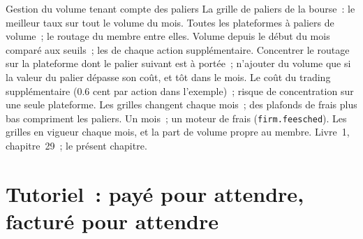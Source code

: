 \begin{strategyfile}{Gestion du volume tenant compte des paliers}\label{strat:hf:rebates-inverted-venues-and-tiers:tier}
 La grille de paliers de la bourse~: le meilleur taux sur tout le volume du mois.
 Toutes les plateformes à paliers de volume~; le routage du membre entre elles.
 Volume depuis le début du mois comparé aux seuils~; les  de chaque action supplémentaire.
 Concentrer le routage sur la plateforme dont le palier suivant est à portée~; n'ajouter du volume que si la valeur du palier dépasse son coût,
et tôt dans le mois.
 Le coût du trading supplémentaire (0.6 cent par action dans l'exemple)~; risque de concentration sur une seule plateforme.
 Les grilles changent chaque mois~; des plafonds de frais plus bas compriment les paliers.
 Un mois~; un moteur de frais (\texttt{firm.feesched}).
 Les grilles en vigueur chaque mois, et la part de volume propre au membre.
 Livre~1, chapitre~29~; le présent chapitre.
\end{strategyfile}

\section{Tutoriel~: payé pour attendre, facturé pour attendre}\label{tut:hf:rebates-inverted-venues-and-tiers:tut}

